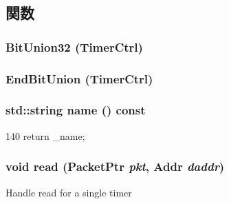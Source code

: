 \subsection{関数}
\hypertarget{classCpuLocalTimer_1_1Timer_aeae80462edd494698c490d195af1cf9f}{
\subsubsection[{BitUnion32}]{\setlength{\rightskip}{0pt plus 5cm}BitUnion32 (TimerCtrl)}}
\label{classCpuLocalTimer_1_1Timer_aeae80462edd494698c490d195af1cf9f}
\hypertarget{classCpuLocalTimer_1_1Timer_a4ac1bc7cc3873c99b8469db37f16e565}{
\subsubsection[{EndBitUnion}]{\setlength{\rightskip}{0pt plus 5cm}EndBitUnion (TimerCtrl)}}
\label{classCpuLocalTimer_1_1Timer_a4ac1bc7cc3873c99b8469db37f16e565}
\hypertarget{classCpuLocalTimer_1_1Timer_a37627d5d5bba7f4a8690c71c2ab3cb07}{
\subsubsection[{name}]{\setlength{\rightskip}{0pt plus 5cm}std::string name () const}}
\label{classCpuLocalTimer_1_1Timer_a37627d5d5bba7f4a8690c71c2ab3cb07}



\begin{DoxyCode}
140 { return _name; }
\end{DoxyCode}
\hypertarget{classCpuLocalTimer_1_1Timer_a6ecbcc960e1c0cd0a0f4c64e7ae58d14}{
\subsubsection[{read}]{\setlength{\rightskip}{0pt plus 5cm}void read ({\bf PacketPtr} {\em pkt}, \/  {\bf Addr} {\em daddr})}}
\label{classCpuLocalTimer_1_1Timer_a6ecbcc960e1c0cd0a0f4c64e7ae58d14}
Handle read for a single timer 


